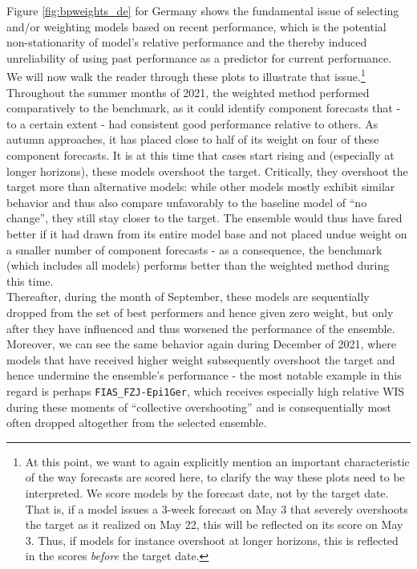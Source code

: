 Figure \ref{fig:bpweights_de} for Germany shows the fundamental issue of selecting and/or weighting models based on recent performance, which is the potential non-stationarity of model's relative performance and the thereby induced unreliability of using past performance as a predictor for current performance. We will now walk the reader through these plots to illustrate that issue.\footnote{At this point, we want to again explicitly mention an important characteristic of the way forecasts are scored here, to clarify the way these plots need to be interpreted. We score models by the forecast date, not by the target date. That is, if a model issues a 3-week forecast on May 3 that severely overshoots the target as it realized on May 22, this will be reflected on its score on May 3. Thus, if models for instance overshoot at longer horizons, this is reflected in the scores \textit{before} the target date.} Throughout the summer months of 2021, the weighted method performed comparatively to the benchmark, as it could identify component forecasts that - to a certain extent - had consistent good performance relative to others. As autumn approaches, it has placed close to half of its weight on four of these component forecasts. It is at this time that cases start rising and (especially at longer horizons), these models overshoot the target. Critically, they overshoot the target more than alternative models: while other models mostly exhibit similar behavior and thus also compare unfavorably to the baseline model of ``no change'', they still stay closer to the target. The ensemble would thus have fared better if it had drawn from its entire model base and not placed undue weight on a smaller number of component forecasts - as a consequence, the benchmark (which includes all models) performs better than the weighted method during this time.\\ 
Thereafter, during the month of September, these models are sequentially dropped from the set of best performers and hence given zero weight, but only after they have influenced and thus worsened the performance of the ensemble. Moreover, we can see the same behavior again during December of 2021, where models that have received higher weight subsequently overshoot the target and hence undermine the ensemble's performance - the most notable example in this regard is perhaps \texttt{FIAS\_FZJ-Epi1Ger}, which receives especially high relative WIS during these moments of ``collective overshooting'' and is consequentially most often dropped altogether from the selected ensemble.\\ 
